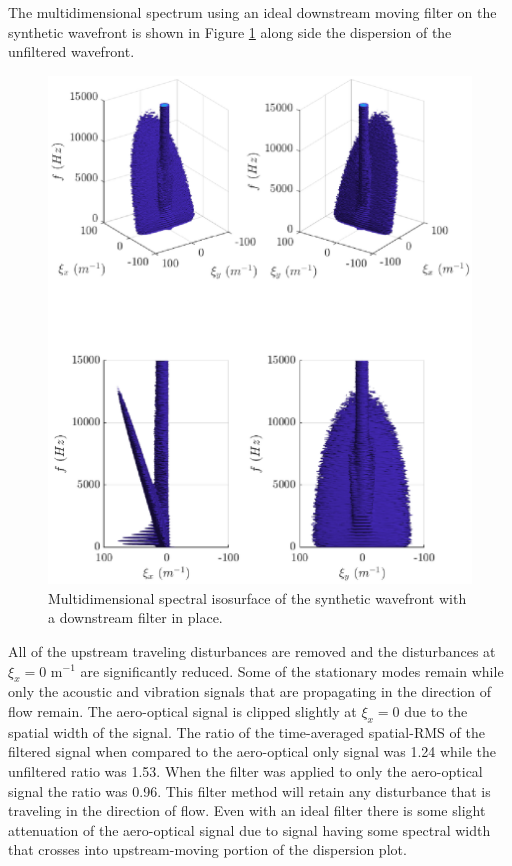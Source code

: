 The multidimensional spectrum using an ideal downstream moving filter on the synthetic wavefront is shown in Figure \ref{fig:06_filter_downstream} along side the dispersion of the unfiltered wavefront.
\begin{figure}
 \centering
 \includegraphics{../matlab/06_single_sensor_filtering/filter_downstream.eps}
 \caption{Multidimensional spectral isosurface of the synthetic wavefront with a downstream filter in place.}
 \label{fig:06_filter_downstream}
\end{figure}
All of the upstream traveling disturbances are removed and the disturbances at $\xi_x=0$ m$^{-1}$ are significantly reduced.
Some of the stationary modes remain while only the acoustic and vibration signals that are propagating in the direction of flow remain.
The aero-optical signal is clipped slightly at $\xi_x=0$ due to the spatial width of the signal.
The ratio of the time-averaged spatial-RMS of the filtered signal when compared to the aero-optical only signal was 1.24 while the unfiltered ratio was 1.53.
When the filter was applied to only the aero-optical signal the ratio was 0.96.
This filter method will retain any disturbance that is traveling in the direction of flow.
Even with an ideal filter there is some slight attenuation of the aero-optical signal due to signal having some spectral width that crosses into upstream-moving portion of the dispersion plot.


